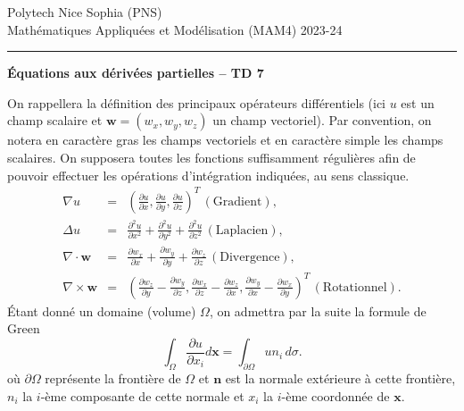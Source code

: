 \documentclass[12pt,a4paper]{article}
\begin{document}
 \hfill Polytech Nice Sophia (PNS)\\
\noindent Math\'ematiques Appliqu\'ees et Mod\'elisation (MAM4) \hfill 2023-24 \\

\hrule

\bigskip
\bigskip

\begin{center}{\bf \'Equations aux d\'eriv\'ees partielles --
TD 7}\end{center}

\bigskip

\noindent On rappellera la d\'efinition des principaux op\'erateurs
diff\'erentiels (ici $u$ est un champ scalaire et $\mathbf{w} =
(w_x,w_y,w_z)$ un champ vectoriel). Par convention, on notera en caract\`ere gras les champs vectoriels et en
caract\`ere simple les champs scalaires. On supposera toutes les fonctions suffisamment r\'eguli\`eres afin de
  pouvoir effectuer les op\'erations d'int\'egration indiqu\'ees, au sens classique.
$$
\begin{array}{lcl}
\nabla u &=& \displaystyle\left(\frac{\partial u}{\partial
    x},\frac{\partial u}{\partial y }, \frac{\partial u}{\partial
    z}\right)^T \, (\mbox{Gradient}), \\[2ex]
\Delta u &=& \displaystyle \frac{\partial^2 u}{\partial
    x^2}+\frac{\partial^2 u}{\partial y^2 }+\frac{\partial^2 u}{\partial
    z^2} \, (\mbox{Laplacien}), \\[2ex]
\nabla\cdot \mathbf{w} &=&  \displaystyle\frac{\partial w_x}{\partial x} +
\frac{\partial w_y}{\partial y} +\frac{\partial w_z}{\partial z}\,  (\mbox{Divergence}),\\[2ex]
 \nabla\times \mathbf{w} &=&  \displaystyle\left(\frac{\partial w_z}{\partial y}
   -\frac{\partial w_y}{\partial z},\frac{\partial w_x}{\partial z}
   -\frac{\partial w_z}{\partial x}, \frac{\partial w_y}{\partial x}
   -\frac{\partial w_x}{\partial y}  \right)^T \, (\mbox{Rotationnel}).
\end{array}
$$
\'Etant donn\'e un domaine (volume) $\Omega$, on admettra par la
suite la formule de Green
$$
\int_{\Omega} \frac{\partial u}{\partial x_i} d\mathbf{x}
= \int_{\partial\Omega}u n_i \, d\sigma.
$$
o\`u $\partial\Omega$ repr\'esente la fronti\`ere de $\Omega$ et
$\mathbf{n}$ est la normale ext\'erieure à cette fronti\`ere, $n_i$
la $i$-\`eme composante de cette normale et $x_i$ la $i$-\`eme
coordonn\'ee de $\mathbf{x}$.\\
\end{document}
